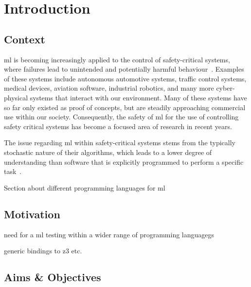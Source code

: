 
\chapter{Introduction} %
\label{Chapter1} %



\section{Context}

\Gls{ml} is becoming increasingly applied to the control of safety-critical systems, where failures lead to unintended and potentially harmful behaviour~\citep{amodei}.
Examples of these systems include autonomous automotive systems, traffic control systems, medical devices, aviation software, industrial robotics, and many more cyber-physical systems that interact with our environment.
Many of these systems have so far only existed as proof of concepts, but are steadily approaching commercial use within our society.
Consequently, the safety of \gls{ml} for the use of controlling safety critical systems has become a focused area of research in recent years.

The issue regarding \gls{ml} within safety-critical systems stems from the typically stochastic nature of their algorithms, which
leads to a lower degree of understanding than software that is explicitly programmed to perform a specific task~\citep{pereira}.

Section about different programming languages for ml



\section{Motivation}


need for a ml testing within a wider range of programming languagegs

generic bindings to z3 etc.


\section{Aims \& Objectives}
